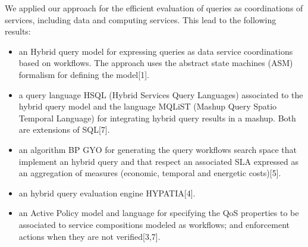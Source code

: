 We  applied our approach for the efficient evaluation of queries as coordinations of services, including data  and computing services.  
This lead to the following results: 
\begin{itemize}
\item  an Hybrid query model for expressing queries as data service coordinations based on workflows. The approach uses the abstract state machines (ASM) formalism for defining the model[1].

\item  a query language HSQL (Hybrid Services Query Languages) associated to the hybrid query model and the language MQLiST (Mashup Query Spatio Temporal Language) for integrating hybrid query results in a mashup. Both are extensions of SQL[7]. 

\item  an algorithm BP GYO for generating the query workflows search space that implement an hybrid query and that respect an associated SLA expressed as an aggregation of measures (economic, temporal and energetic costs)[5].

\item an hybrid query evaluation engine HYPATIA[4].

\item an Active Policy model and language for specifying the QoS properties to be associated to service compositions modeled as workflows; and enforcement actions when they are not verified[3,7].

\end{itemize}


